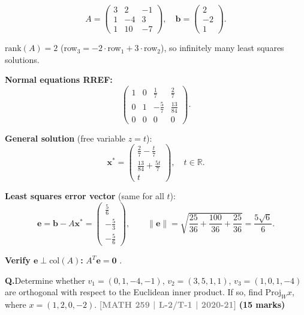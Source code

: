 \documentclass[12pt,a3paper]{article}
\newcommand{\yr}[1]{\hfill\textcolor{gray}{\small\textbf{[#1]}}}
\newcommand{\mk}[1]{\textcolor{orange!70!black}{\small\textbf{(#1 marks)}}}
\newcounter{qnum}
\newcommand{\Q}[1]{%
  \needspace{4\baselineskip}
  \refstepcounter{qnum}
  \vspace{6pt}
  \noindent\textbf{Q\theqnum.}\enspace #1\par
}
\begin{document}
\begin{tcolorbox}[enhanced,breakable,
  colback=cD!4,colframe=cD,boxrule=0.8pt,arc=5pt,
  title={\textbf{Answer --- Least Squares: $3x+2y-z=2,\;x-4y+3z=-2,\;x+10y-7z=1$}},
  fonttitle=\bfseries\color{white},colbacktitle=cD]

\[
A=\begin{pmatrix}3&2&-1\\1&-4&3\\1&10&-7\end{pmatrix},\quad
\mathbf{b}=\begin{pmatrix}2\\-2\\1\end{pmatrix}.
\]

$\mathrm{rank}(A)=2$ (row$_3=-2\cdot$row$_1+3\cdot$row$_2$), so infinitely many least squares solutions.

\textbf{Normal equations RREF:}
\[
\begin{pmatrix}1&0&\frac{1}{7}&\frac{2}{7}\\0&1&-\frac{5}{7}&\frac{13}{84}\\0&0&0&0\end{pmatrix}.
\]

\textbf{General solution} (free variable $z=t$):
\[
\mathbf{x}^*=\begin{pmatrix}\frac{2}{7}-\frac{t}{7}\\[4pt]\frac{13}{84}+\frac{5t}{7}\\[4pt]t\end{pmatrix},\quad t\in\mathbb{R}.
\]

\textbf{Least squares error vector} (same for all $t$):
\[
\mathbf{e}=\mathbf{b}-A\mathbf{x}^*=\begin{pmatrix}\frac{5}{6}\\[4pt]-\frac{5}{3}\\[4pt]-\frac{5}{6}\end{pmatrix},\qquad
\|\mathbf{e}\|=\sqrt{\frac{25}{36}+\frac{100}{36}+\frac{25}{36}}=\frac{5\sqrt{6}}{6}.
\]

\textbf{Verify $\mathbf{e}\perp\mathrm{col}(A)$:} $A^T\mathbf{e}=\mathbf{0}$ . \checkmark

\end{tcolorbox}


\Q{Determine whether $v_1 = (0,1,-4,-1)$, $v_2 = (3,5,1,1)$, $v_3 = (1,0,1,-4)$ are orthogonal with respect to the Euclidean inner product. If so, find $\mathrm{Proj}_W x$, where $x = (1,2,0,-2)$.
\yr{MATH 259 | L-2/T-1 | 2020-21} \mk{15}}
\end{document}
